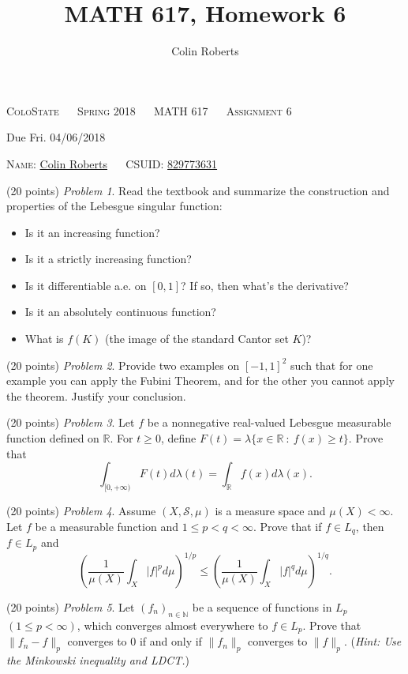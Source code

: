 \documentclass[leqno]{article}
\author{Colin Roberts}
\title{MATH 617, Homework 6}
\theoremstyle{nonumberplain}
\newcommand{\R}{\mathbb{R}}
\newcommand{\N}{\mathbb{N}}
\newcommand{\Sets}{\mathcal{S}}
\begin{document}
\begin{center}
  \textsc{\large ColoState ~~ Spring 2018 ~~ MATH 617 ~~ Assignment 6}
\end{center}

\begin{center}
  \textrm{Due Fri. 04/06/2018}
\end{center}

\vglue 0.10in

\bigskip
\noindent
\textsc{Name:} \underline{Colin Roberts\hglue 1.5in} ~~
\textsc{CSUID:} \underline{829773631\hglue 1.5in}

\vskip 0.15in

\bigskip
\noindent
(20 points) \textit{Problem 1}. \quad
Read the textbook and summarize the construction and properties of the Lebesgue singular function:
\begin{itemize}
\item Is it an increasing function?
\item Is it a strictly increasing function?
\item Is it differentiable a.e. on $[0,1]$? If so, then what's the derivative?
\item Is it an absolutely continuous function?
\item What is $f(K)$ (the image of the standard Cantor set $K$)?
\end{itemize}

\bigskip
\bigskip
\noindent
(20 points) \textit{Problem 2}. \quad
Provide two examples on $[-1,1]^2$ such that for one example you can apply the Fubini Theorem, and for the other you cannot apply the theorem. Justify your conclusion.

\bigskip
\bigskip
\noindent
(20 points) \textit{Problem 3}. \quad
Let $f$ be a nonnegative real-valued Lebesgue measurable function defined on $\R$. For $t\geq 0$, define $F(t)=\lambda \{x\in \R ~\colon~ f(x)\geq t\}$. Prove that
\[
\int_{[0,+\infty)}F(t)d\lambda(t) = \int_\R f(x)d\lambda (x).
\]

\bigskip
\bigskip
\noindent
(20 points) \textit{Problem 4}. \quad
Assume $(X,\Sets,\mu)$ is a measure space and $\mu(X)<\infty$. Let $f$ be a measurable function and $1\leq p < q <\infty$. Prove that if $f\in L_q$, then $f\in L_p$ and
\[
\left( \frac{1}{\mu(X)}\int_X |f|^p d\mu\right)^{1/p} \leq \left(\frac{1}{\mu(X)}\int_X |f|^q d\mu\right)^{1/q}.
\]

\bigskip
\bigskip
\noindent
(20 points) \textit{Problem 5}. \quad
Let $(f_n)_{n\in \N}$ be a sequence of functions in $L_p$ $(1\leq p < \infty)$, which converges almost everywhere to $f\in L_p$. Prove that $\|f_n-f\|_p$ converges to $0$ if and only if $\|f_n\|_p$ converges to $\|f\|_p$. (\emph{Hint: Use the Minkowski inequality and LDCT.})
\end{document}
